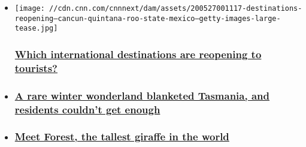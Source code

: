 \begin{itemize}
\item
  \href{/travel/article/global-destinations-reopening-to-tourists/index.html}{}

  \texttt{[image: //cdn.cnn.com/cnnnext/dam/assets/200527001117-destinations-reopening---cancun-quintana-roo-state-mexico---getty-images-large-tease.jpg]}

  \hypertarget{which-international-destinations-are-reopening-to-tourists}{%
  \subsubsection{\texorpdfstring{\href{/travel/article/global-destinations-reopening-to-tourists/index.html}{Which
  international destinations are reopening to
  tourists?}}{Which international destinations are reopening to tourists?}}\label{which-international-destinations-are-reopening-to-tourists}}
\item
  \hypertarget{a-rare-winter-wonderland-blanketed-tasmania-and-residents-couldnt-get-enough}{%
  \subsubsection{\texorpdfstring{\href{/2020/08/05/world/rare-snow-event-australia/index.html}{A
  rare winter wonderland blanketed Tasmania, and residents couldn't get
  enough}}{A rare winter wonderland blanketed Tasmania, and residents couldn't get enough}}\label{a-rare-winter-wonderland-blanketed-tasmania-and-residents-couldnt-get-enough}}
\item
  \hypertarget{meet-forest-the-tallest-giraffe-in-the-world}{%
  \subsubsection{\texorpdfstring{\href{/2020/07/31/australia/worlds-tallest-giraffe-scli-intl-scn/index.html}{Meet
  Forest, the tallest giraffe in the
  world}}{Meet Forest, the tallest giraffe in the world}}\label{meet-forest-the-tallest-giraffe-in-the-world}}
\end{itemize}

